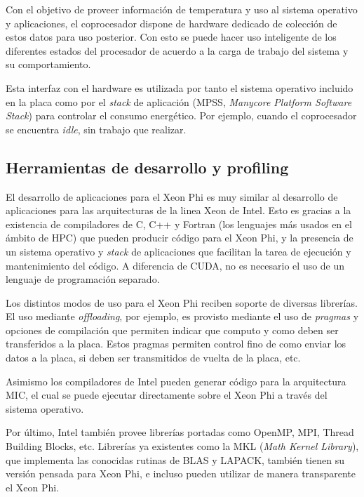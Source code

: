 Con el objetivo de proveer informaci\'on de temperatura y uso al sistema operativo y aplicaciones, el coprocesador dispone de
hardware dedicado de colecci\'on de estos datos para uso posterior. Con esto se puede hacer uso inteligente de los diferentes
estados del procesador de acuerdo a la carga de trabajo del sistema y su comportamiento.

Esta interfaz con el hardware es utilizada por tanto el sistema operativo incluido en la placa como por el \textit{stack} de
aplicaci\'on (MPSS, \textit{Manycore Platform Software Stack}) para controlar el consumo energ\'etico. Por ejemplo, cuando el
coprocesador se encuentra \textit{idle}, sin trabajo que realizar.

\subsection{Herramientas de desarrollo y profiling}

El desarrollo de aplicaciones para el Xeon Phi es muy similar al desarrollo de aplicaciones para las arquitecturas
de la linea Xeon de Intel. Esto es gracias a la existencia de compiladores de C, C++ y Fortran (los lenguajes m\'as usados en
el \'ambito de HPC) que pueden producir c\'odigo para el Xeon Phi, y la presencia de un sistema operativo y \textit{stack}
de aplicaciones que facilitan la tarea de ejecuci\'on y mantenimiento del c\'odigo. A diferencia de \nvidia CUDA, no es necesario
el uso de un lenguaje de programaci\'on separado.

Los distintos modos de uso para el Xeon Phi reciben soporte de diversas librer\'ias. El uso mediante \textit{offloading}, por ejemplo,
es provisto mediante el uso de \textit{pragmas} y opciones de compilaci\'on que permiten indicar que computo y como deben ser transferidos
a la placa. Estos pragmas permiten control fino de como enviar los datos a la placa, si deben ser transmitidos de vuelta de la placa,
etc.

Asimismo los compiladores de Intel pueden generar c\'odigo para la arquitectura MIC, el cual se puede ejecutar directamente sobre
el Xeon Phi a trav\'es del sistema operativo.

Por \'ultimo, Intel tambi\'en provee librer\'ias portadas como OpenMP, MPI, Thread Building Blocks, etc. Librer\'ias ya existentes
como la MKL (\textit{Math Kernel Library}), que implementa las conocidas rutinas de BLAS y LAPACK, tambi\'en tienen su versi\'on
pensada para Xeon Phi, e incluso pueden utilizar de manera transparente el Xeon Phi.

